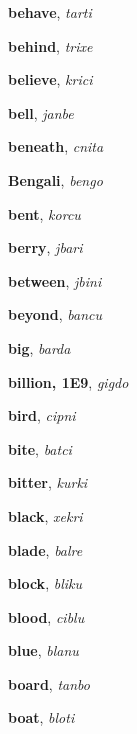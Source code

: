 \documentclass[12pt]{book}
\begin{document}
\begin{description}
\item[ ] \textbf{behave}, \textit{tarti}

\item[ ] \textbf{behind}, \textit{trixe}

\item[ ] \textbf{believe}, \textit{krici}

\item[ ] \textbf{bell}, \textit{janbe}

\item[ ] \textbf{beneath}, \textit{cnita}

\item[ ] \textbf{Bengali}, \textit{bengo}

\item[ ] \textbf{bent}, \textit{korcu}

\item[ ] \textbf{berry}, \textit{jbari}

\item[ ] \textbf{between}, \textit{jbini}

\item[ ] \textbf{beyond}, \textit{bancu}

\item[ ] \textbf{big}, \textit{barda}

\item[ ] \textbf{billion, 1E9}, \textit{gigdo}

\item[ ] \textbf{bird}, \textit{cipni}

\item[ ] \textbf{bite}, \textit{batci}

\item[ ] \textbf{bitter}, \textit{kurki}

\item[ ] \textbf{black}, \textit{xekri}

\item[ ] \textbf{blade}, \textit{balre}

\item[ ] \textbf{block}, \textit{bliku}

\item[ ] \textbf{blood}, \textit{ciblu}

\item[ ] \textbf{blue}, \textit{blanu}

\item[ ] \textbf{board}, \textit{tanbo}

\item[ ] \textbf{boat}, \textit{bloti}


\end{description}
\end{document}
